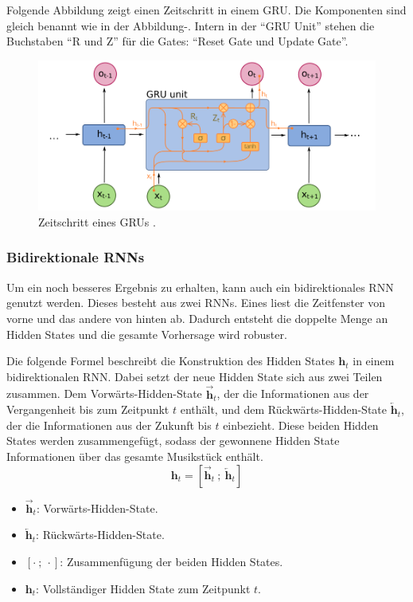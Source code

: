 Folgende Abbildung zeigt einen Zeitschritt in einem GRU.
Die Komponenten sind gleich benannt wie in der Abbildung-.
Intern in der \enquote{GRU Unit} stehen die Buchstaben \enquote{R und Z} für die Gates:
\enquote{Reset Gate und Update Gate}.
\begin{figure}[H]
    \centering
    \includegraphics[width=1\textwidth]{Graphics/GRU_timestep}
    \caption[GRU Zeitschritt]{Zeitschritt eines GRUs  \cite{wikimediaRNN}.}
    \label{fig:gru_timestep}
\end{figure}

\subsubsection{Bidirektionale RNNs}
Um ein noch besseres Ergebnis zu erhalten, kann auch ein bidirektionales RNN genutzt werden.
Dieses besteht aus zwei RNNs.
Eines liest die Zeitfenster von vorne und das andere von hinten ab.
Dadurch entsteht die doppelte Menge an Hidden States und die gesamte Vorhersage wird robuster.

Die folgende Formel beschreibt die Konstruktion des Hidden States $\mathbf{h}_t$ in einem bidirektionalen RNN.
Dabei setzt der neue Hidden State sich aus zwei Teilen zusammen.
Dem Vorwärts-Hidden-State $\overrightarrow{\mathbf{h}}_t$,
der die Informationen aus der Vergangenheit bis zum Zeitpunkt $t$ enthält,
und dem Rückwärts-Hidden-State $\overleftarrow{\mathbf{h}}_t$,
der die Informationen aus der Zukunft bis $t$ einbezieht.
Diese beiden Hidden States werden zusammengefügt,
sodass der gewonnene Hidden State Informationen über das gesamte Musikstück enthält.
\[
\mathbf{h}_t = \left[ \overrightarrow{\mathbf{h}}_t \ ;\ \overleftarrow{\mathbf{h}}_t \right]
\]
\begin{itemize}
\item $\overrightarrow{\mathbf{h}}_t$: Vorwärts-Hidden-State.
\item $\overleftarrow{\mathbf{h}}_t$: Rückwärts-Hidden-State.
\item $\left[ \cdot \ ; \ \cdot \right]$: Zusammenfügung der beiden Hidden States.
\item $\mathbf{h}_t$: Vollständiger Hidden State zum Zeitpunkt $t$.
\end{itemize}

